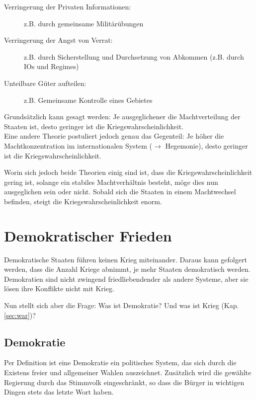 \documentclass[a4paper, 11pt]{article}
\begin{document}
\begin{description}
    \item[Verringerung der Privaten Informationen: ] z.B. durch gemeinsame Militärübungen
    \item[Verringerung der Angst von Verrat: ] z.B. durch Sicherstellung und Durchsetzung von Abkommen (z.B. durch IOs und Regimes)
    \item[Unteilbare Güter aufteilen: ] z.B. Gemeinsame Kontrolle eines Gebietes
\end{description}

Grundsätzlich kann gesagt werden: Je ausgeglichener die Machtverteilung der Staaten ist, desto geringer ist die Kriegswahrscheinlichkeit. \\
Eine andere Theorie postuliert jedoch genau das Gegenteil: Je höher die Machtkonzentration im internationalen System ($\rightarrow$  Hegemonie), desto geringer ist die Kriegswahrscheinlichkeit.

Worin sich jedoch beide Theorien einig sind ist, dass die Kriegswahrscheinlichkeit gering ist, solange ein stabiles Machtverhältnis besteht, möge dies nun ausgeglichen sein oder nicht. Sobald sich die Staaten in einem Machtwechsel befinden, steigt die Kriegswahrscheinlichkeit enorm.

\section{Demokratischer Frieden}
Demokratische Staaten führen keinen Krieg miteinander. Daraus kann gefolgert werden, dass die Anzahl Kriege abnimmt, je mehr Staaten demokratisch werden. Demokratien sind nicht zwingend friedliebendender als andere Systeme, aber sie lösen ihre Konflikte nicht mit Krieg.

Nun stellt sich aber die Frage: Was ist Demokratie? Und was ist Krieg (Kap. \ref{sec:war})?

\subsection{Demokratie}
Per Definition ist eine Demokratie ein politisches System, das sich durch die Existens freier und allgemeiner Wahlen auszeichnet. Zusätzlich wird die gewählte Regierung durch das Stimmvolk eingeschränkt, so dass die Bürger in wichtigen Dingen stets das letzte Wort haben.
\end{document}
